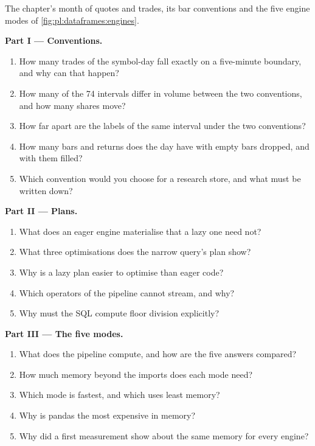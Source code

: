 \begin{problem}\label{pb:pl:dataframes:1}
The chapter's month of quotes and trades, its bar conventions and the five engine modes of \cref{fig:pl:dataframes:engines}.

\medskip\noindent\textbf{Part I --- Conventions.}
\begin{enumerate}
\item How many trades of the symbol-day fall exactly on a five-minute boundary, and why can that happen?
\item How many of the 74 intervals differ in volume between the two conventions, and how many shares move?
\item How far apart are the labels of the same interval under the two conventions?
\item How many bars and returns does the day have with empty bars dropped, and with them filled?
\item Which convention would you choose for a research store, and what must be written down?
\end{enumerate}

\medskip\noindent\textbf{Part II --- Plans.}
\begin{enumerate}[resume]
\item What does an eager engine materialise that a lazy one need not?
\item What three optimisations does the narrow query's plan show?
\item Why is a lazy plan easier to optimise than eager code?
\item Which operators of the pipeline cannot stream, and why?
\item Why must the SQL compute floor division explicitly?
\end{enumerate}

\medskip\noindent\textbf{Part III --- The five modes.}
\begin{enumerate}[resume]
\item What does the pipeline compute, and how are the five answers compared?
\item How much memory beyond the imports does each mode need?
\item Which mode is fastest, and which uses least memory?
\item Why is pandas the most expensive in memory?
\item Why did a first measurement show about the same memory for every engine?
\end{enumerate}


\end{problem}
